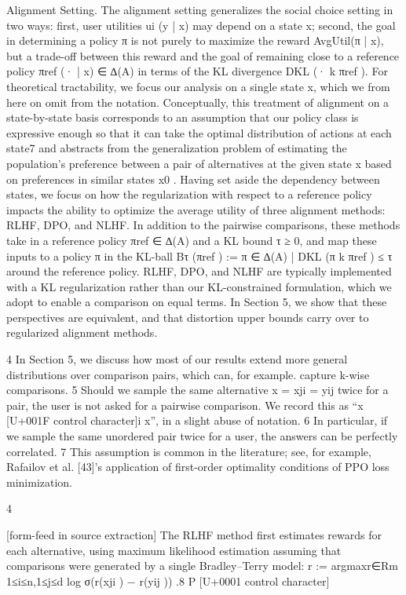 \documentclass[10pt]{article}
\begin{document}
\begin{ReviewVerbatim}
Alignment Setting. The alignment setting generalizes the social choice setting in two ways: first,
user utilities ui (y | x) may depend on a state x; second, the goal in determining a policy π is not
purely to maximize the reward AvgUtil(π | x), but a trade-off between this reward and the goal of
remaining close to a reference policy πref (· | x) ∈ ∆(A) in terms of the KL divergence DKL (· k πref ).
For theoretical tractability, we focus our analysis on a single state x, which we from here on omit
from the notation. Conceptually, this treatment of alignment on a state-by-state basis corresponds to
an assumption that our policy class is expressive enough so that it can take the optimal distribution of
actions at each state7 and abstracts from the generalization problem of estimating the population’s
preference between a pair of alternatives at the given state x based on preferences in similar states x0 .
Having set aside the dependency between states, we focus on how the regularization with respect
to a reference policy impacts the ability to optimize the average utility of three alignment methods:
RLHF, DPO, and NLHF. In addition to the pairwise comparisons, these methods take in a reference
policy πref ∈ ∆(A) and a KL bound τ ≥ 0, and map these inputs to a policy π in the KL-ball
Bτ (πref ) := {π ∈ ∆(A) | DKL (π k πref ) ≤ τ } around the reference policy. RLHF, DPO, and NLHF
are typically implemented with a KL regularization rather than our KL-constrained formulation,
which we adopt to enable a comparison on equal terms. In Section 5, we show that these perspectives
are equivalent, and that distortion upper bounds carry over to regularized alignment methods.

   4
     In Section 5, we discuss how most of our results extend more general distributions over comparison pairs,
which can, for example. capture k-wise comparisons.
   5
     Should we sample the same alternative x = xji = yij twice for a pair, the user is not asked for a pairwise
comparison. We record this as “x [U+001F control character]i x”, in a slight abuse of notation.
   6
     In particular, if we sample the same unordered pair twice for a user, the answers can be perfectly correlated.
   7
     This assumption is common in the literature; see, for example, Rafailov et al. [43]’s application of first-order
optimality conditions of PPO loss minimization.


                                                           4

[form-feed in source extraction]
The RLHF method first estimates rewards for each alternative, using maximum likelihood estimation
assuming that comparisons were generated by a single Bradley–Terry model:
                  r := argmaxr∈Rm 1≤i≤n,1≤j≤d log σ(r(xji ) − r(yij )) .8
                                     P                                     [U+0001 control character]


\end{ReviewVerbatim}
\end{document}
